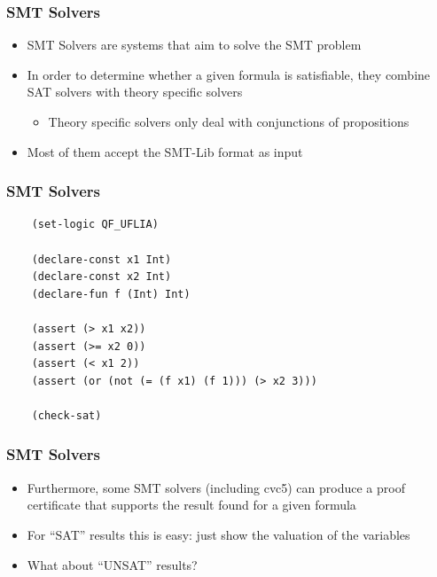 \documentclass[usepdftitle=false,aspectratio=169,usenames,dvipsnames]{beamer}
\newcommand\vitem{\vfill\item}
\begin{document}
\begin{frame}
  \frametitle{SMT Solvers}
  \begin{itemize}
    \item SMT Solvers are systems that aim to solve the SMT problem
    \vitem In order to determine whether a given formula is satisfiable, they combine SAT solvers with theory specific solvers
    \begin{itemize}
      \item Theory specific solvers only deal with conjunctions of propositions
    \end{itemize}
    \vitem Most of them accept the SMT-Lib format as input
  \end{itemize}
\end{frame}

\begin{frame}[fragile]
  \frametitle{SMT Solvers}
  \begin{verbatim}
    (set-logic QF_UFLIA)

    (declare-const x1 Int)
    (declare-const x2 Int)
    (declare-fun f (Int) Int)

    (assert (> x1 x2))
    (assert (>= x2 0))
    (assert (< x1 2))
    (assert (or (not (= (f x1) (f 1))) (> x2 3)))

    (check-sat)
  \end{verbatim}
\end{frame}

\begin{frame}
  \frametitle{SMT Solvers}
  \begin{itemize}
    \item Furthermore, some SMT solvers (including cvc5) can produce a proof certificate that supports the result found for a given formula
    \vitem For ``SAT'' results this is easy: just show the valuation of the variables
    \vitem What about ``UNSAT'' results?
  \end{itemize}
\end{frame}

\end{document}
